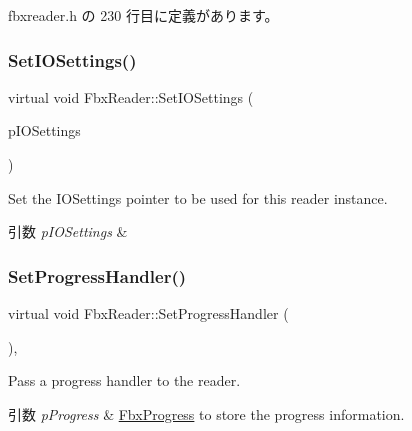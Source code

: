  fbxreader.\+h の 230 行目に定義があります。

\mbox{\label{class_fbx_reader_af39e468081c3ebe63565409ef36f833a}} 
\subsubsection{\texorpdfstring{Set\+I\+O\+Settings()}{SetIOSettings()}}
{\footnotesize\ttfamily virtual void Fbx\+Reader\+::\+Set\+I\+O\+Settings (\begin{DoxyParamCaption}\item[{\hyperlink{class_fbx_i_o_settings}{Fbx\+I\+O\+Settings} $\ast$}]{p\+I\+O\+Settings }\end{DoxyParamCaption})\hspace{0.3cm}{\ttfamily [virtual]}}

Set the I\+O\+Settings pointer to be used for this reader instance. 
\begin{DoxyParams}{引数}
{\em p\+I\+O\+Settings} & \\
\hline
\end{DoxyParams}
\mbox{\label{class_fbx_reader_aeba190e276718b1abfa6c26a83d2c363}} 
\subsubsection{\texorpdfstring{Set\+Progress\+Handler()}{SetProgressHandler()}}
{\footnotesize\ttfamily virtual void Fbx\+Reader\+::\+Set\+Progress\+Handler (\begin{DoxyParamCaption}\item[{\hyperlink{class_fbx_progress}{Fbx\+Progress} $\ast$}]{ }\end{DoxyParamCaption})\hspace{0.3cm}{\ttfamily [inline]}, {\ttfamily [virtual]}}

Pass a progress handler to the reader. 
\begin{DoxyParams}{引数}
{\em p\+Progress} & \hyperlink{class_fbx_progress}{Fbx\+Progress} to store the progress information. \\
\hline
\end{DoxyParams}


